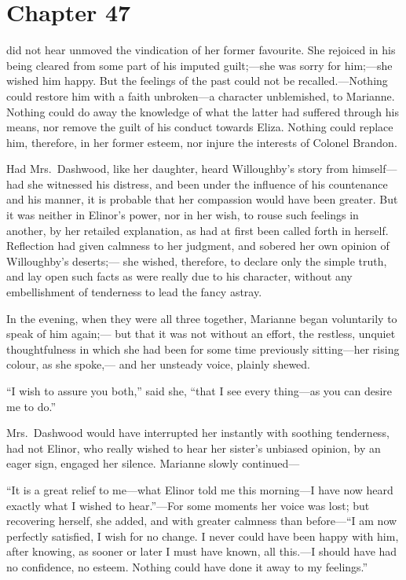 \chapter{Chapter 47}


 did not hear unmoved the vindication
of her former favourite.  She rejoiced in his being
cleared from some part of his imputed guilt;---she was
sorry for him;---she wished him happy.  But the feelings
of the past could not be recalled.---Nothing could restore
him with a faith unbroken---a character unblemished,
to Marianne.  Nothing could do away the knowledge
of what the latter had suffered through his means,
nor remove the guilt of his conduct towards Eliza.
Nothing could replace him, therefore, in her former esteem,
nor injure the interests of Colonel Brandon.

Had Mrs.\ Dashwood, like her daughter, heard Willoughby's
story from himself---had she witnessed his distress,
and been under the influence of his countenance and his
manner, it is probable that her compassion would have
been greater.  But it was neither in Elinor's power,
nor in her wish, to rouse such feelings in another, by her
retailed explanation, as had at first been called forth
in herself.  Reflection had given calmness to her judgment,
and sobered her own opinion of Willoughby's deserts;---%
she wished, therefore, to declare only the simple truth,
and lay open such facts as were really due to his character,
without any embellishment of tenderness to lead the
fancy astray.

In the evening, when they were all three together,
Marianne began voluntarily to speak of him again;---%
but that it was not without an effort, the restless,
unquiet thoughtfulness in which she had been for some time
previously sitting---her rising colour, as she spoke,---%
and her unsteady voice, plainly shewed.

``I wish to assure you both,'' said she, ``that I see
every thing---as you can desire me to do.''

Mrs.\ Dashwood would have interrupted her instantly
with soothing tenderness, had not Elinor, who really wished
to hear her sister's unbiased opinion, by an eager sign,
engaged her silence.  Marianne slowly continued---%

``It is a great relief to me---what Elinor told
me this morning---I have now heard exactly what I
wished to hear.''---For some moments her voice was lost;
but recovering herself, she added, and with greater
calmness than before---``I am now perfectly satisfied,
I wish for no change.  I never could have been happy
with him, after knowing, as sooner or later I must
have known, all this.---I should have had no confidence,
no esteem.  Nothing could have done it away to my feelings.''

